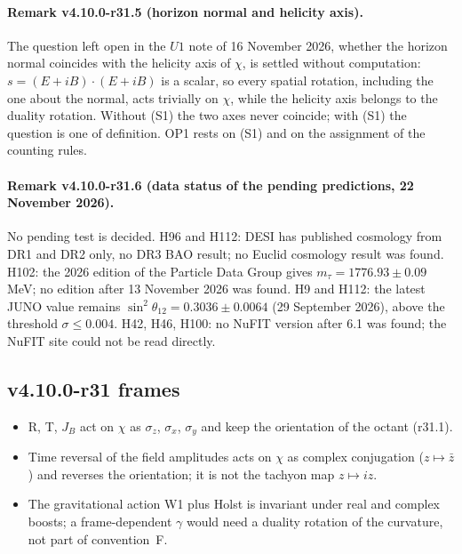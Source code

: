 \paragraph{Remark v4.10.0-r31.5 (horizon normal and helicity axis).}
The question left open in the \(U1\) note of 16 November 2026, whether the horizon normal coincides with the helicity axis of \(\chi\), is
settled without computation: \(s=(E+iB)\cdot(E+iB)\) is a scalar, so every spatial rotation, including the one about the normal, acts
trivially on \(\chi\), while the helicity axis belongs to the duality rotation.  Without (S1) the two axes never coincide; with (S1) the
question is one of definition.  OP1 rests on (S1) and on the assignment of the counting rules.

\paragraph{Remark v4.10.0-r31.6 (data status of the pending predictions, 22 November 2026).}
No pending test is decided.  H96 and H112: DESI has published cosmology from DR1 and DR2 only, no DR3 BAO result; no Euclid cosmology
result was found.  H102: the 2026 edition of the Particle Data Group gives \(m_\tau=1776.93\pm0.09\)\,MeV; no edition after 13 November
2026 was found.  H9 and H112: the latest JUNO value remains \(\sin^2\theta_{12}=0.3036\pm0.0064\) (29 September 2026), above the
threshold \(\sigma\le0.004\).  H42, H46, H100: no NuFIT version after 6.1 was found; the NuFIT site could not be read directly.

\subsection*{v4.10.0-r31 frames}
\label{subsec:v4100-r31-frames}

\begin{itemize}[leftmargin=2em]
\item R, T, \(J_B\) act on \(\chi\) as \(\sigma_z\), \(\sigma_x\), \(\sigma_y\) and keep the orientation of the octant (r31.1).
\item Time reversal of the field amplitudes acts on \(\chi\) as complex conjugation (\(z\mapsto\bar z\)) and reverses the orientation; it is not
the tachyon map \(z\mapsto iz\).
\item The gravitational action W1 plus Holst is invariant under real and complex boosts; a frame-dependent \(\gamma\) would need a duality
rotation of the curvature, not part of convention~F.
\end{itemize}

